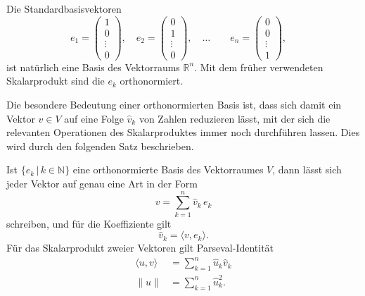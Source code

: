 Die Standardbasisvektoren
\[
e_1 = \begin{pmatrix}1\\0\\\vdots\\0\end{pmatrix},\quad
e_2 = \begin{pmatrix}0\\1\\\vdots\\0\end{pmatrix},\quad
\dots
\qquad
e_n = \begin{pmatrix}0\\0\\\vdots\\1\end{pmatrix},\quad
\]
ist natürlich eine Basis des Vektorraums $\mathbb R^n$.
Mit dem früher verwendeten Skalarprodukt sind die $e_k$ orthonormiert.

Die besondere Bedeutung einer orthonormierten Basis ist, dass sich damit
ein Vektor $v\in V$ auf eine Folge $\hat{v}_k$ von Zahlen reduzieren 
lässt, mit der sich die relevanten Operationen des Skalarproduktes
immer noch durchführen lassen.
Dies wird durch den folgenden Satz beschrieben.

\begin{satz}
\label{satz:parseval}
Ist $\{e_k\,|\, k\in\mathbb N\}$ eine orthonormierte Basis des Vektorraumes
$V$, dann lässt sich jeder Vektor auf genau eine Art in der Form 
\begin{equation}
v = \sum_{k=1}^n \hat v_k\, e_k
\label{gemoetrie:zerlegung}
\end{equation}
schreiben, und für die Koeffiziente gilt
\begin{equation}
\hat{v}_k = \langle v,e_k\rangle.
\label{geometrie:synthese}
\end{equation}
Für das Skalarprodukt zweier Vektoren gilt Parseval-Identität
\begin{align}
\langle u,v\rangle
&=
\sum_{k=1}^n \hat{u}_k\hat{v}_k
\label{geometrie:parseval-prod}
\\
\|u\|
&=
\sum_{k=1}^n \hat{u}_k^2.
\label{geometrie:parseval-norm}
\end{align}
\end{satz}

